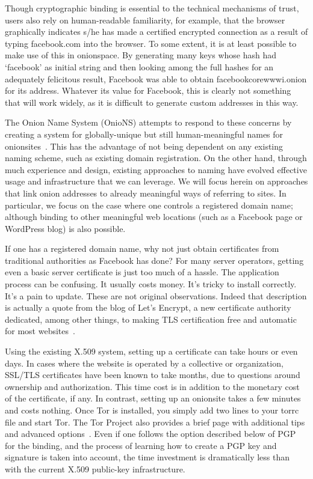 \documentclass[10pt, conference, compsocconf]{styles/IEEEtran}
\newcommand{\griffin}[1]{{\color{blue}\em (Griffin says: ``#1'')}}
\begin{document}
Though cryptographic binding is essential to the technical mechanisms
of trust, users also rely on human-readable familiarity, for example,
that the browser graphically indicates s/he has made a certified
encrypted connection as a result of typing facebook.com into the
browser.  To some extent, it is at least possible to make use of this
in onionspace. By generating many keys whose hash had `facebook' as
initial string and then looking among the full hashes for an
adequately felicitous result, Facebook was able to obtain
facebookcorewwwi.onion for its address. Whatever its value for
Facebook, this is clearly not something that will work widely, as it
is difficult to generate custom addresses in this way. 

The Onion Name System (OnioNS) attempts to respond to these concerns
by creating a system for globally-unique but still human-meaningful
names for onionsites~\cite{vickers-onions}.  This has the advantage of
not being dependent on any existing naming scheme, such as existing
domain registration. On the other hand, through much experience and
design, existing approaches to naming have evolved effective usage and
infrastructure that we can leverage. We will focus herein on
approaches that link onion addresses to already meaningful ways of
referring to sites. In particular, we focus on the case where one controls
a registered domain name; although binding to other meaningful
web locations (such as a Facebook page or WordPress blog) is also possible.

If one has a registered domain name,
why not just obtain certificates from traditional authorities as
Facebook has done? For many server operators, getting
even a basic server certificate is just too much of a hassle. The
application process can be confusing. It usually costs money. It's
tricky to install correctly. It's a pain to update. 
These are not original observations. Indeed that description is
actually a quote from the blog of Let's Encrypt, a new certificate
authority dedicated, among other things, to making TLS certification
free and automatic for most websites~\cite{lets-encrypt}. 


Using the existing X.509 system, setting up a certificate can take
hours or even days. In cases where the website is operated by a
collective or organization, SSL/TLS certificates have been known to
take months, due to questions around ownership and authorization.
This time cost is in addition to the monetary cost of the certificate, if any.
In contrast, setting up an onionsite takes a few minutes and costs
nothing. Once Tor is installed, you simply add two lines to your torrc file 
and start Tor. The Tor Project also provides a brief page with
additional tips and advanced options~\cite{hs-config}.  Even if
one follows the option described below of PGP for the binding, and the process
of learning how to create a PGP key and signature is taken into
account, the time investment is dramatically less than with the
current X.509 public-key infrastructure.
\end{document}
